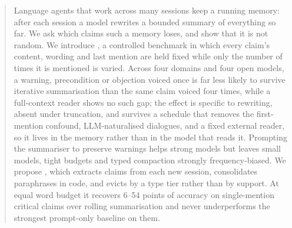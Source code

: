 \begin{abstract}
Language agents that work across many sessions keep a running memory: after each session a model rewrites a bounded summary of everything so far.
We ask which claims such a memory loses, and show that it is not random.
We introduce \sys{}, a controlled benchmark in which every claim's content, wording and last mention are held fixed while only the number of times it is mentioned is varied.
Across four domains and four open models, a warning, precondition or objection voiced once is far less likely to survive iterative summarisation than the same claim voiced four times, while a full-context reader shows no such gap; the effect is specific to rewriting, absent under truncation, and survives a schedule that removes the first-mention confound, LLM-naturalised dialogues, and a fixed external reader, so it lives in the memory rather than in the model that reads it.
Prompting the summariser to preserve warnings helps strong models but leaves small models, tight budgets and typed compaction strongly frequency-biased.
We propose \ledger{}, which extracts claims from each new session, consolidates paraphrases in code, and evicts by a type tier rather than by support.
At equal word budget it recovers 6--54 points of accuracy on single-mention critical claims over rolling summarisation and never underperforms the strongest prompt-only baseline on them.
\end{abstract}
